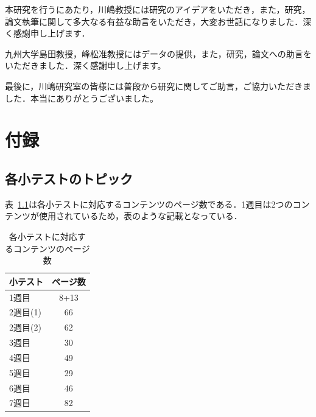 \documentclass[a4paper,12pt]{ltjsreport}
\begin{document}
本研究を行うにあたり，川嶋教授には研究のアイデアをいただき，また，研究，論文執筆に関して多大なる有益な助言をいただき，大変お世話になりました．深く感謝申し上げます．

九州大学島田教授，峰松准教授にはデータの提供，また，研究，論文への助言をいただきました．深く感謝申し上げます。

最後に，川嶋研究室の皆様には普段から研究に関してご助言，ご協力いただきました．本当にありがとうございました。





\appendix
\chapter{付録}
\section{各小テストのトピック}
表~\ref{tb:topic}は各小テストに対応するコンテンツのページ数である．1週目は2つのコンテンツが使用されているため，表のような記載となっている．

\begin{table}[tbp]
  \centering
  \caption{各小テストに対応するコンテンツのページ数}
  \label{tb:topic}
  \begin{tabular}{l||c}
    小テスト & ページ数 \\ \hline\hline
    1週目 & 8+13 \\ \hline
    2週目(1) & 66 \\ \hline
    2週目(2) & 62 \\ \hline
    3週目 & 30 \\ \hline
    4週目 & 49 \\ \hline
    5週目 & 29 \\ \hline
    6週目 & 46 \\ \hline
    7週目 & 82 \\ \hline
  \end{tabular}
\end{table}

\end{document}
